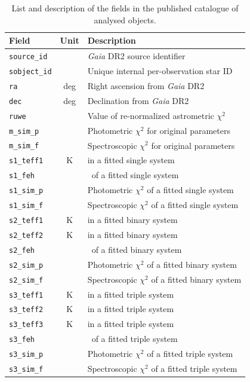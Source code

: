 \begin{table}
	\centering
	\caption{List and description of the fields in the published catalogue of analysed objects.}
	\label{tab:out_table_triple}
	\begin{tabular}{l c l}
		\hline
		Field & Unit & Description \\ 
		\hline
		\texttt{source\_id} & & {\it Gaia} DR2 source identifier \\
		\texttt{sobject\_id} & & Unique internal per-observation star ID \\
		\texttt{ra} & deg & Right ascension from {\it Gaia} DR2 \\
		\texttt{dec} & deg & Declination from {\it Gaia} DR2 \\
		\texttt{ruwe} & & Value of re-normalized astrometric $\chi^2$ \\
		
		\texttt{m\_sim\_p} & & Photometric $\chi^2$ for original parameters \\
		\texttt{m\_sim\_f} & & Spectroscopic $\chi^2$ for original parameters \\
		
		\texttt{s1\_teff1} & K & \Teffn{1} in a fitted single system \\
		\texttt{s1\_feh} & & \Feh\ of a fitted single system \\
		\texttt{s1\_sim\_p} & & Photometric $\chi^2$ of a fitted single system \\
		\texttt{s1\_sim\_f} & & Spectroscopic $\chi^2$ of a fitted single system\\
		
		\texttt{s2\_teff1} & K & \Teffn{1} in a fitted binary system \\	
		\texttt{s2\_teff2} & K & \Teffn{2} in a fitted binary system \\
		\texttt{s2\_feh} & & \Feh\ of a fitted binary system \\
		\texttt{s2\_sim\_p} & & Photometric $\chi^2$ of a fitted binary system \\
		\texttt{s2\_sim\_f} & & Spectroscopic $\chi^2$ of a fitted binary system\\
		
		\texttt{s3\_teff1} & K & \Teffn{1} in a fitted triple system \\	
		\texttt{s3\_teff2} & K & \Teffn{2} in a fitted triple system \\
		\texttt{s3\_teff3} & K & \Teffn{3} in a fitted triple system \\
		\texttt{s3\_feh} & & \Feh\ of a fitted triple system \\
		\texttt{s3\_sim\_p} & & Photometric $\chi^2$ of a fitted triple system \\
		\texttt{s3\_sim\_f} & & Spectroscopic $\chi^2$ of a fitted triple system\\
		

\end{tabular}
\end{table}
